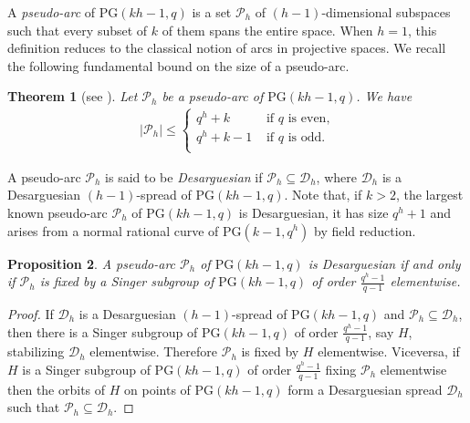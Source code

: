 \documentclass[11pt]{article}
\newtheorem{theorem}{Theorem}[section]
\newtheorem{prop}[theorem]{Proposition}
\theoremstyle{definition}
\numberwithin{equation}{section}
\def\cP{\mathcal P}
\def\cD{\mathcal D}
\def\PG{\mathrm{PG}}
\begin{document}
A {\em pseudo-arc} of $\PG(kh-1,q)$ is a set $\cP_{h}$ of $(h-1)$-dimensional subspaces such that every subset of $k$ of them spans the entire space. When $h=1$, this definition reduces to the classical notion of arcs in projective
spaces. We recall the following fundamental bound on the size of a pseudo-arc.


\begin{theorem} [see \textnormal{\cite[Theorem 4.11]{Thas1971}}] Let $\cP_h$ be a pseudo-arc of $\PG(kh-1,q)$. We have
\begin{align*}
|\cP_h| \le 
\begin{cases}
q^h + k & \mbox{ if } q \mbox{ is even,} \\
q^h + k - 1 & \mbox{ if } q \mbox{ is odd.} \\
\end{cases}
\end{align*}
\end{theorem}

A pseudo-arc $\cP_{h}$ is said to be {\em Desarguesian} if $\cP_h \subseteq \cD_h$, where $\cD_h$ is a Desarguesian $(h-1)$-spread of $\PG(kh-1, q)$. Note that, if $k >2$, the largest known pseudo-arc $\cP_h$ of $\PG(kh-1, q)$ is Desarguesian, it has size $q^h+1$ and arises from a normal rational curve of $\PG(k-1, q^h)$ by field reduction.

\begin{prop}
A pseudo-arc $\cP_h$ of $\PG(kh-1, q)$ is Desarguesian if and only if $\cP_h$ is fixed by a Singer subgroup of $\PG(kh-1, q)$ of order $\frac{q^h-1}{q-1}$ elementwise. 
\end{prop}
\begin{proof}
If $\cD_h$ is a Desarguesian $(h-1)$-spread of $\PG(kh-1, q)$ and $\cP_h \subseteq \cD_h$, then there is a Singer subgroup of $\PG(kh-1, q)$ of order $\frac{q^h-1}{q-1}$, say $H$, stabilizing $\cD_h$ elementwise. Therefore $\cP_h$ is fixed by $H$ elementwise. Viceversa, if $H$ is a Singer subgroup of $\PG(kh-1, q)$ of order $\frac{q^h-1}{q-1}$ fixing $\cP_h$ elementwise then the orbits of $H$ on points of $\PG(kh-1, q)$ form a Desarguesian spread $\cD_h$ such that $\cP_h \subseteq \cD_h$.  
\end{proof}
\end{document}
